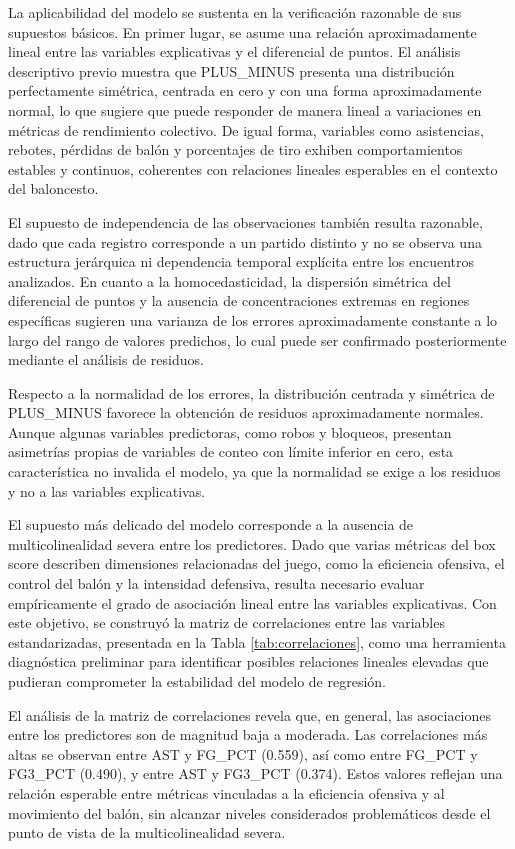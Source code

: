 \documentclass[12pt]{article}
\begin{document}
La aplicabilidad del modelo se sustenta en la verificación razonable de sus supuestos básicos. En primer lugar, se asume una relación aproximadamente lineal entre las variables explicativas y el diferencial de puntos. El análisis descriptivo previo muestra que PLUS\_MINUS presenta una distribución perfectamente simétrica, centrada en cero y con una forma aproximadamente normal, lo que sugiere que puede responder de manera lineal a variaciones en métricas de rendimiento colectivo. De igual forma, variables como asistencias, rebotes, pérdidas de balón y porcentajes de tiro exhiben comportamientos estables y continuos, coherentes con relaciones lineales esperables en el contexto del baloncesto.

El supuesto de independencia de las observaciones también resulta razonable, dado que cada registro corresponde a un partido distinto y no se observa una estructura jerárquica ni dependencia temporal explícita entre los encuentros analizados. En cuanto a la homocedasticidad, la dispersión simétrica del diferencial de puntos y la ausencia de concentraciones extremas en regiones específicas sugieren una varianza de los errores aproximadamente constante a lo largo del rango de valores predichos, lo cual puede ser confirmado posteriormente mediante el análisis de residuos.

Respecto a la normalidad de los errores, la distribución centrada y simétrica de PLUS\_MINUS favorece la obtención de residuos aproximadamente normales. Aunque algunas variables predictoras, como robos y bloqueos, presentan asimetrías propias de variables de conteo con límite inferior en cero, esta característica no invalida el modelo, ya que la normalidad se exige a los residuos y no a las variables explicativas.

El supuesto más delicado del modelo corresponde a la ausencia de multicolinealidad severa entre los predictores. Dado que varias métricas del box score describen dimensiones relacionadas del juego, como la eficiencia ofensiva, el control del balón y la intensidad defensiva, resulta necesario evaluar empíricamente el grado de asociación lineal entre las variables explicativas. Con este objetivo, se construyó la matriz de correlaciones entre las variables estandarizadas, presentada en la Tabla \ref{tab:correlaciones}, como una herramienta diagnóstica preliminar para identificar posibles relaciones lineales elevadas que pudieran comprometer la estabilidad del modelo de regresión.

El análisis de la matriz de correlaciones revela que, en general, las asociaciones entre los predictores son de magnitud baja a moderada. Las correlaciones más altas se observan entre AST y FG\_PCT (0.559), así como entre FG\_PCT y FG3\_PCT (0.490), y entre AST y FG3\_PCT (0.374). Estos valores reflejan una relación esperable entre métricas vinculadas a la eficiencia ofensiva y al movimiento del balón, sin alcanzar niveles considerados problemáticos desde el punto de vista de la multicolinealidad severa.
\end{document}
